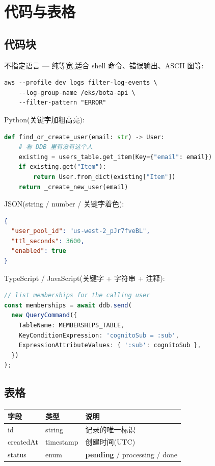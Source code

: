 \documentclass[11pt,a4paper]{ctexart}
\begin{document}
\section{代码与表格}

\subsection{代码块}

不指定语言 — 纯等宽,适合 shell 命令、错误输出、ASCII 图等:\par

\begin{lstlisting}
aws --profile dev logs filter-log-events \
    --log-group-name /eks/bota-api \
    --filter-pattern "ERROR"
\end{lstlisting}

Python(关键字加粗高亮):\par

\begin{lstlisting}[language=python]
def find_or_create_user(email: str) -> User:
    # 看 DDB 里有没有这个人
    existing = users_table.get_item(Key={"email": email})
    if existing.get("Item"):
        return User.from_dict(existing["Item"])
    return _create_new_user(email)
\end{lstlisting}

JSON(string / number / 关键字着色):\par

\begin{lstlisting}[language=json]
{
  "user_pool_id": "us-west-2_pJr7fveBL",
  "ttl_seconds": 3600,
  "enabled": true
}
\end{lstlisting}

TypeScript / JavaScript(关键字 + 字符串 + 注释):\par

\begin{lstlisting}[language=TypeScript]
// list memberships for the calling user
const memberships = await ddb.send(
  new QueryCommand({
    TableName: MEMBERSHIPS_TABLE,
    KeyConditionExpression: 'cognitoSub = :sub',
    ExpressionAttributeValues: { ':sub': cognitoSub },
  })
);
\end{lstlisting}

\subsection{表格}

\par\bigskip
\noindent
\begin{xltabular}{\textwidth}{|Y|Y|Y|}
\hline
{} \textbf{\textcolor[HTML]{FFFFFF}{字段}} & \textbf{\textcolor[HTML]{FFFFFF}{类型}} & \textbf{\textcolor[HTML]{FFFFFF}{说明}} \\
\hline
\endhead
id & string & 记录的唯一标识 \\
\hline
createdAt & timestamp & 创建时间(UTC) \\
\hline
status & enum & \textbf{pending} /\allowbreak{} processing /\allowbreak{} done \\
\hline
\end{xltabular}
\bigskip
\end{document}
